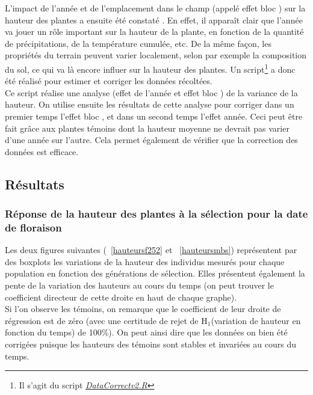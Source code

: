 \documentclass[12pt,a4paper]{article}
\begin{document}
			 				L'impact de l'année et de l'emplacement dans le champ (appelé \og effet bloc \fg) sur la hauteur des plantes a ensuite été constaté . En effet, il apparaît clair que l'année va jouer un rôle important sur la hauteur de la plante, en fonction de la quantité de précipitations, de la température cumulée, etc. De la même façon, les propriétés du terrain peuvent varier localement, selon par exemple la composition du sol, ce qui va là encore influer sur la hauteur des plantes. Un script\footnote{Il s'agit du script \textit{\ul{DataCorrectv2.R}}} a donc été réalisé pour estimer et corriger les données récoltées.\\
			 				Ce script réalise une analyse (effet de l'année et \og effet bloc \fg) de la variance de la hauteur. On utilise ensuite les résultats de cette analyse pour corriger dans un premier temps l'\og effet bloc \fg, et dans un second temps l'effet année. Ceci peut être fait grâce aux plantes témoins dont la hauteur moyenne ne devrait pas varier d'une année sur l'autre. Cela permet également de vérifier que la correction des données est efficace.
			 				
			 		\subsection{Résultats}
			 			
			 			\subsubsection{Réponse de la hauteur des plantes à la sélection pour la date de floraison}
			 				
			 				Les deux figures suivantes (~\ref{hauteursf252} et ~\ref{hauteursmbs}) représentent par des boxplots les variations de la hauteur des individus mesurés pour chaque population en fonction des générations de sélection. Elles présentent également la pente de la variation des hauteurs au cours du temps (on peut trouver le coefficient directeur de cette droite en haut de chaque graphe).\\
			 				Si l'on observe les témoins, on remarque que le coefficient de leur droite de régression est de zéro (avec une certitude de rejet de H$_{1}$(variation de hauteur en fonction du temps) de 100\%). On peut ainsi dire que les données on bien été corrigées puisque les hauteurs des témoins sont stables et invariées au cours du temps.\\
			 				
\end{document}
